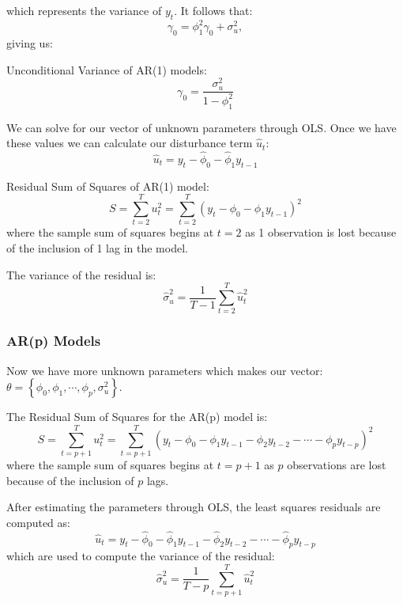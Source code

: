 \documentclass[11pt]{article}
\begin{document}
which represents the variance of $y_t$. It follows that:
\[\gamma_0 = \phi_1^2 \gamma_0 + \sigma_u^2,\]
giving us:
\begin{definition}
    Unconditional Variance of AR(1) models:
    \[\gamma_0 = \dfrac{\sigma_u^2}{1-\phi_1^2}\]
\end{definition}

We can solve for our vector of unknown parameters through OLS. Once we have these values we can calculate our disturbance term $\hat{u}_t$:
\begin{equation}
\widehat{u}_t=y_t-\widehat{\phi}_0-\widehat{\phi}_1 y_{t-1}
\end{equation}

\begin{definition}
    Residual Sum of Squares of AR(1) model:
    \begin{equation}
S=\sum_{t=2}^T u_t^2=\sum_{t=2}^T\left(y_t-\phi_0-\phi_1 y_{t-1}\right)^2
\end{equation}
where the sample sum of squares begins at $t=2$ as 1 observation is lost because of the inclusion of 1 lag in the model.
\end{definition}



The variance of the residual is:
\begin{equation}
\widehat{\sigma}_u^2=\frac{1}{T-1} \sum_{t=2}^T \widehat{u}_t^2
\end{equation}

\subsubsection{AR(p) Models}

Now we have more unknown parameters which makes our vector:$ \theta=\left\{\phi_0, \phi_1, \cdots, \phi_p, \sigma_u^2\right\}$.

\begin{definition}
    The Residual Sum of Squares for the AR(p) model is:
    \begin{equation}
S=\sum_{t=p+1}^T u_t^2=\sum_{t=p+1}^T\left(y_t-\phi_0-\phi_1 y_{t-1}-\phi_2 y_{t-2}-\cdots-\phi_p y_{t-p}\right)^2
\end{equation}
where the sample sum of squares begins at $t=p+1$ as $p$ observations are lost because of the inclusion of $p$ lags.
\end{definition}

After estimating the parameters through OLS, the least squares residuals are computed as:
\begin{equation}
\widehat{u}_t=y_t-\widehat{\phi}_0-\widehat{\phi}_1 y_{t-1}-\widehat{\phi}_2 y_{t-2}-\cdots-\widehat{\phi}_p y_{t-p}
\end{equation}
which are used to compute the variance of the residual:
\begin{equation}
\widehat{\sigma}_u^2=\frac{1}{T-p} \sum_{t=p+1}^T \widehat{u}_t^2
\end{equation}
\end{document}
